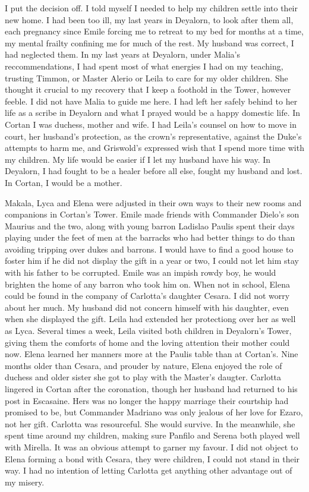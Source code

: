 \documentclass{article}
\begin{document}
I put the decision off. I told myself I needed to help my children settle into their new home. I had been too ill, my last years in Deyalorn, to look after them all, each pregnancy since Emile forcing me to retreat to my bed for months at a time, my mental frailty confining me for much of the rest. My husband was correct, I had neglected them. In my last years at Deyalorn, under Malia's reccommendations, I had spent most of what energies I had on my teaching, trusting Timmon, or Master Alerio or Leila to care for my older children. She thought it crucial to my recovery that I keep a foothold in the Tower, however feeble. I did not have Malia to guide me here. I had left her safely behind to her life as a scribe in Deyalorn and what I prayed would be a happy domestic life. In Cortan I was duchess, mother and wife. I had Leila's counsel on how to move in court, her husband's protection, as the crown's representative, against the Duke's attempts to harm me, and Griswold's expressed wish that I spend more time with my children. My life would be easier if I let my husband have his way.  In Deyalorn, I had fought to be a healer before all else, fought my husband and lost. In Cortan, I would be a mother.

Makala, Lyca and Elena were adjusted in their own ways to their new rooms and companions in Cortan's Tower. Emile made friends with Commander Dielo's son Maurius and the two, along with young barron Ladislao Paulis spent their days playing under the feet of men at the barracks who had better things to do than avoiding tripping over dukes and barrons. I would have to find a good house to foster him if he did not display the gift in a year or two, I could not let him stay with his father to be corrupted. Emile was an impish rowdy boy, he would brighten the home of any barron who took him on. When not in school, Elena could be found in the company of Carlotta's daughter Cesara. I did not worry about her much. My husband did not concern himself with his daughter, even when she displayed the gift. Leila had extended her protectiong over her as well as Lyca. Several times a week, Leila visited both children in Deyalorn's Tower, giving them the comforts of home and the loving attention their mother could now. Elena learned her manners more at the Paulis table than at Cortan's. Nine months older than Cesara, and prouder by nature, Elena enjoyed the role of duchess and older sister she got to play with the Master's daugter. Carlotta lingered in Cortan after the coronation, though her husband had returned to his post in Escasaine. Hers was no longer the happy marriage their courtship had promised to be, but Commander Madriano was only jealous of her love for Ezaro, not her gift. Carlotta was resourceful. She would survive. In the meanwhile, she spent time around my children, making sure Panfilo and Serena both played well with Mirella. It was an obvious attempt to garner my favour. I did not object to Elena forming a bond with Cesara, they were children, I could not stand in their way. I had no intention of letting Carlotta get anything other advantage out of my misery.
\end{document}
